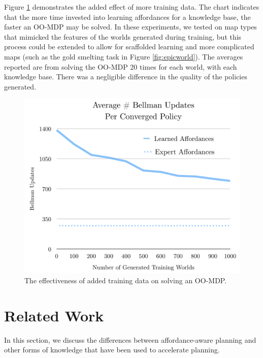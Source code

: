 \documentclass[conference]{IEEEtran}
\begin{document}
Figure \ref{fig:training_results} demonstrates the added effect of more training data. The chart indicates that the more time invested into learning affordances for a knowledge base, the faster an OO-MDP may be solved. In these experiments, we tested on map types that mimicked the features of the worlds generated during training, but this process could be extended to allow for scaffolded learning and more complicated maps (such as the gold smelting task in Figure \ref{fig:epicworld}). The averages reported are from solving the OO-MDP 20 times for each world, with each knowledge base. There was a negligible difference in the quality of the policies generated.
\begin{figure}[b]
\centering
\includegraphics[scale=0.25]{figures/training_results.png}%
  \caption{The effectiveness of added training data on solving an OO-MDP.}
  \label{fig:training_results}
\end{figure}

\section{Related Work}
\label{sec:related-work}

In this section, we discuss the differences between
affordance-aware planning and other forms of knowledge that
have been used to accelerate planning.

\end{document}
